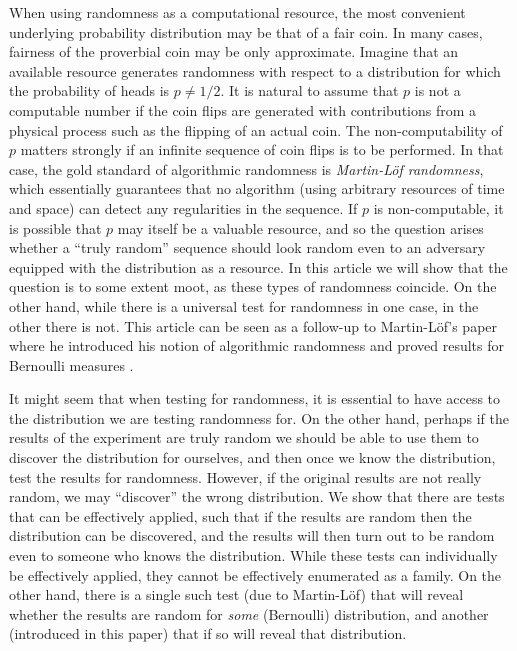 When using randomness as a computational resource, the most convenient underlying probability distribution may be that of a fair coin. In many cases, fairness of the proverbial coin may be only approximate. Imagine that an available resource generates randomness with respect to a distribution for which the probability of heads is $p\ne 1/2$. It is natural to assume that $p$ is not a computable number if the coin flips are generated with  contributions from a physical process such as the flipping of an actual coin. The non-computability of $p$ matters strongly if an infinite sequence of coin flips is to be performed. In that case, the gold standard of algorithmic randomness is \emph{Martin-L\"of randomness}, which essentially guarantees that no algorithm (using arbitrary resources of time and space) can detect any regularities in the sequence. If $p$ is non-computable, it is possible that $p$ may itself be a valuable resource, and so the question arises whether a ``truly random'' sequence should look random even to an adversary equipped with the distribution as a resource. %
In this article we will show that the question is to some extent moot, as these types of randomness coincide. On the other hand, while there is a universal test for randomness in one case, in the other there is not.   This article can be seen as a follow-up to Martin-L\"of's paper where he introduced his notion of algorithmic randomness and proved results for Bernoulli measures \cite{ML}.%

It might seem that when testing for randomness, it is essential to have access to the distribution we are testing randomness for. On the other hand, perhaps if the results of the experiment are truly random we should be able to use them to discover the distribution for ourselves, and then once we know the distribution, test the results for randomness. However, if the original results are not really random, we may ``discover'' the wrong distribution.  We show that there are tests that can be effectively applied, such that if the results are random then the distribution can be discovered, and the results will then turn out to be random even to someone who knows the distribution. While these tests can individually be effectively applied, they cannot be effectively enumerated as a family. On the other hand, there is a single such test (due to Martin-L\"of) that will reveal whether the results are random for \emph{some} (Bernoulli) distribution, and another (introduced in this paper) that if so will reveal that distribution. 

